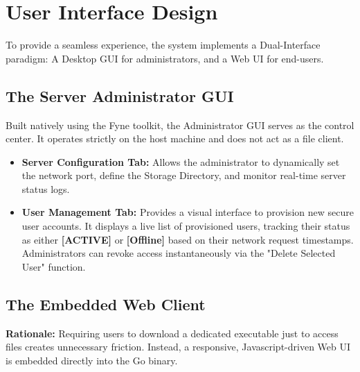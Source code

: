 \documentclass[12pt, a4paper]{article}
\begin{document}
\newpage
\section{User Interface Design}
To provide a seamless experience, the system implements a Dual-Interface paradigm: A Desktop GUI for administrators, and a Web UI for end-users.

\subsection{The Server Administrator GUI}
Built natively using the Fyne toolkit, the Administrator GUI serves as the control center. It operates strictly on the host machine and does not act as a file client.
\begin{itemize}
    \item \textbf{Server Configuration Tab:} Allows the administrator to dynamically set the network port, define the Storage Directory, and monitor real-time server status logs.
    \item \textbf{User Management Tab:} Provides a visual interface to provision new secure user accounts. It displays a live list of provisioned users, tracking their status as either \textbf{[ACTIVE]} or \textbf{[Offline]} based on their network request timestamps. Administrators can revoke access instantaneously via the "Delete Selected User" function.
\end{itemize}


\subsection{The Embedded Web Client}
\textbf{Rationale:} Requiring users to download a dedicated executable just to access files creates unnecessary friction. Instead, a responsive, Javascript-driven Web UI is embedded directly into the Go binary. 
\end{document}
